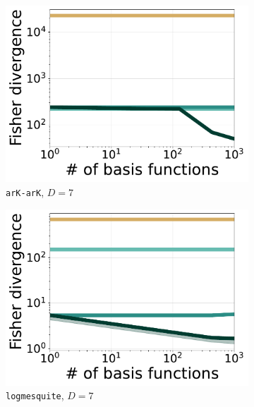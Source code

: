 \begin{figure}[t]
\begin{subfigure}[b]{0.245\linewidth}
        \includegraphics[scale=0.21]{figs/expts-pdb/PDB_44_scores_noflow.pdf}
\caption{\texttt{arK-arK}, $D=7$
            }
    \end{subfigure}
    \begin{subfigure}[b]{0.245\linewidth}
        \includegraphics[scale=0.21]{figs/expts-pdb/PDB_95_scores_noflow.pdf}
    \caption{\texttt{logmesquite}, $D=7$ %
            }
    \end{subfigure}
    \begin{subfigure}[b]{0.245\linewidth}

\end{subfigure}
\end{figure}
